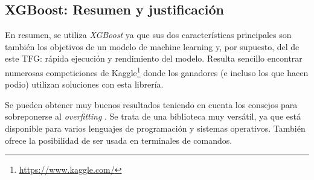 \subsection{XGBoost: Resumen y justificación}

En resumen, se utiliza \textit{XGBoost} ya que sus dos características principales son también los objetivos de un modelo de machine learning y, por supuesto, del de este TFG: rápida ejecución y rendimiento del modelo. Resulta sencillo encontrar numerosas competiciones de Kaggle\footnote{\url{https://www.kaggle.com/}} donde los ganadores (e incluso los que hacen podio) utilizan soluciones con esta librería.\par 

Se pueden obtener muy buenos resultados teniendo en cuenta los consejos para sobreponerse al \textit{overfitting} . Se trata de una biblioteca muy versátil, ya que está disponible para varios lenguajes de programación y sistemas operativos. También ofrece la posibilidad de ser usada en terminales de comandos.


